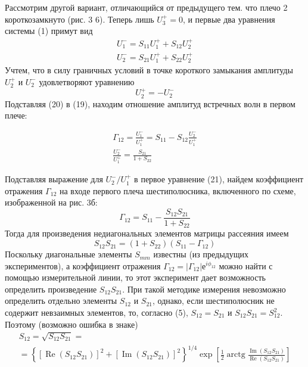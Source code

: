 Рассмотрим другой вариант, отличающийся от предыдущего тем. что плечо 2 короткозамкнуто (рис. 3 6). Теперь лишь $U_3^+=0$, и первые два уравнения системы (1) примут вид
\begin{equation}
	\begin{array} { l } { U _ { 1 } ^ { - } = S _ { 11 } U _ { 1 } ^ { + } + S _ { 12 } U _ { 2 } ^ { + } } \\ { U _ { 2 } ^ { - } = S _ { 21 } U _ { 1 } ^ { + } + S _ { 22 } U _ { 2 } ^ { + } } \end{array}
\end{equation}
Учтем, что в силу граничных условий в точке короткого замыкания амплитуды $U_2^+$ и $U_2^-$ удовлетворяют уравнению
\begin{equation}
	U _ { 2 } ^ { + } = - U _ { 2 } ^ { - }
\end{equation}
Подставляя (20) в (19), находим отношение амплитуд встречных волн в первом плече:

\begin{gather}
{ \Gamma _ { 12 } = \frac { U _ { 1 } ^ { - } } { U _ { 1 } ^ { + } } = S _ { 11 } - S _ { 12 } 	\frac { U _ { 2 } ^ { - } } { U _ { 1 } ^ { + } } } 
\\ { \frac { U _ { 2 } ^ { - } } { U _ { 1 } ^ { + } } = \frac { S _ { 21 } } { 1 + S _ { 22 } } } 
\end{gather}

Подставляя выражение для $U_2^-/U_1^+$ в первое уравнение (21), найдем коэффициент отражения $\Gamma_{12}$ на входе первого плеча шестиполюсника, включенного по схеме, изображенной на рис. 3б:
\begin{equation}
	\Gamma _ { 12 } = S _ { 11 } - \frac { S _ { 12 } S _ { 21 } } { 1 + S _ { 22 } }
\end{equation}
Тогда для произведения недиагональных элементов матрицы рассеяния имеем
\begin{equation}
	S _ { 12 } S _ { 21 } = \left( 1 + S _ { 22 } \right) \left( S _ { 11 } - \Gamma _ { 12 } \right)
\end{equation}
Поскольку диагональные элементы $S_{mm}$ известны (из предыдущих экспериментов), а коэффициент отражения $\Gamma_{12}=|\Gamma_{12}|е^{i\phi_{12}}$ можно найти с помощью измерительной линии, то этот эксперимент дает возможность определить произведение $S_{12}S_{21}$.
При такой методике измерения невозможно определить отдельно элементы $S_{12}$ и $S_{21}$, однако, если шестиполюсник не содержит невзаимных элементов, то, согласно (5), $S_{12} = S_{21}$ и $S_{12}S_{21}=S_{12}^2$. 
Поэтому (возможно ошибка в знаке)
\begin{gather}
	S _ { 12 } = \sqrt { S _ { 12 } S _ { 21 } } = \nonumber \\= \left\{ \left[ \operatorname { Re } \left( S _ { 12 } S _ { 21 } \right) \right] ^ { 2 } + \left[ \operatorname { Im } \left( S _ { 12 } S _ { 21 } \right) \right] ^ { 2 } \right\} ^ { 1 / 4 } \exp \left[ \frac { 1 } { 2 } \operatorname { arctg } \frac { \operatorname { Im } \left( S _ { 12 } S _ { 21 } \right) } { \operatorname { Re } \left( S _ { 12 } S _ { 21 } \right) } \right]
\end{gather}

